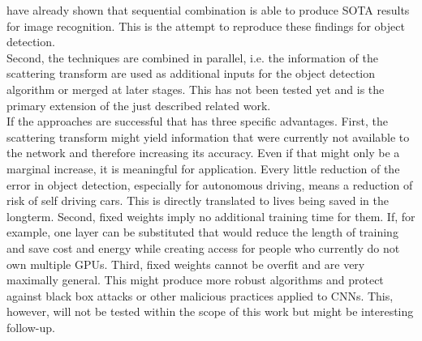 have already shown that sequential combination is able to produce SOTA results for image recognition. This is the attempt to reproduce these findings for object detection. \\
Second, the techniques are combined in parallel, i.e. the information of the scattering transform are used as additional inputs for the object detection algorithm or merged at later stages. This has not been tested yet and is the primary extension of the just described related work.\\
If the approaches are successful that has three specific advantages. First, the scattering transform might yield information that were currently not available to the network and therefore increasing its accuracy. Even if that might only be a marginal increase, it is meaningful for application. Every little reduction of the error in object detection, especially for autonomous driving, means a reduction of risk of self driving cars. This is directly translated to lives being saved in the longterm. 
Second, fixed weights imply no additional training time for them. If, for example, one layer can be substituted that would reduce the length of training and save cost and energy while creating access for people who currently do not own multiple GPUs.
Third, fixed weights cannot be overfit and are very maximally general. This might produce more robust algorithms and protect against black box attacks or other malicious practices applied to CNNs. This, however, will not be tested within the scope of this work but might be interesting follow-up.
